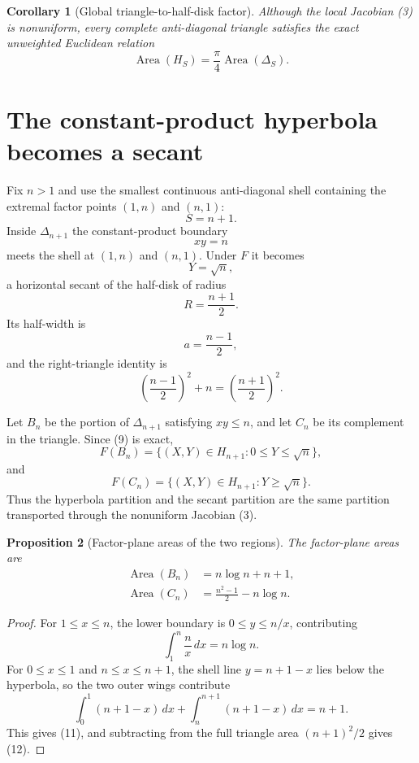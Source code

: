 \documentclass[11pt]{amsart}
\newtheorem{proposition}{Proposition}
\newtheorem{corollary}[proposition]{Corollary}
\theoremstyle{remark}
\begin{document}
\begin{corollary}[Global triangle-to-half-disk factor]\label{cor:pifour}
Although the local Jacobian (3) is nonuniform, every complete anti-diagonal triangle satisfies the exact unweighted Euclidean relation
\begin{equation}
\boxed{
\operatorname{Area}(H_S)=\frac\pi4\operatorname{Area}(\Delta_S).}
\tag{8}
\end{equation}
\end{corollary}

\section{The constant-product hyperbola becomes a secant}
Fix $n>1$ and use the smallest continuous anti-diagonal shell containing the extremal factor points $(1,n)$ and $(n,1)$:
\[
S=n+1.
\]
Inside $\Delta_{n+1}$ the constant-product boundary
\[
xy=n
\]
meets the shell at $(1,n)$ and $(n,1)$. Under $F$ it becomes
\begin{equation}
\boxed{Y=\sqrt n,}\tag{9}
\end{equation}
a horizontal secant of the half-disk of radius
\[
R=\frac{n+1}{2}.
\]
Its half-width is
\[
a=\frac{n-1}{2},
\]
and the right-triangle identity is
\begin{equation}
\boxed{
\left(\frac{n-1}{2}\right)^2+n
=\left(\frac{n+1}{2}\right)^2.}
\tag{10}
\end{equation}

Let $B_n$ be the portion of $\Delta_{n+1}$ satisfying $xy\le n$, and let $C_n$ be its complement in the triangle. Since (9) is exact,
\[
F(B_n)=\{(X,Y)\in H_{n+1}:0\le Y\le\sqrt n\},
\]
and
\[
F(C_n)=\{(X,Y)\in H_{n+1}:Y\ge\sqrt n\}.
\]
Thus the hyperbola partition and the secant partition are the same partition transported through the nonuniform Jacobian (3).

\begin{proposition}[Factor-plane areas of the two regions]\label{prop:factorpartition}
The factor-plane areas are
\begin{align}
\operatorname{Area}(B_n)
&=n\log n+n+1, \tag{11}\\
\operatorname{Area}(C_n)
&=\frac{n^2-1}{2}-n\log n. \tag{12}
\end{align}
\end{proposition}

\begin{proof}
For $1\le x\le n$, the lower boundary is $0\le y\le n/x$, contributing
\[
\int_1^n\frac n x\,dx=n\log n.
\]
For $0\le x\le1$ and $n\le x\le n+1$, the shell line $y=n+1-x$ lies below the hyperbola, so the two outer wings contribute
\[
\int_0^1(n+1-x)\,dx+\int_n^{n+1}(n+1-x)\,dx=n+1.
\]
This gives (11), and subtracting from the full triangle area $(n+1)^2/2$ gives (12).
\end{proof}
\end{document}
